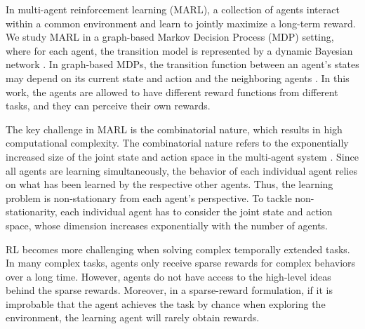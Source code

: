 \documentclass[conf]{new-aiaa}
\begin{document}
In multi-agent reinforcement learning (MARL), a collection of agents interact within a common environment and learn to jointly maximize a long-term reward. We study MARL in a graph-based Markov Decision Process (MDP) setting, where for each agent, the transition model is represented by a dynamic Bayesian network \cite{dean1989model, guestrin2003efficient}. In graph-based MDPs, the transition function between an agent's states may depend on its current state and action and the neighboring agents \cite{forsell2006approximate, cheng2013variational}. In this work, the agents are allowed to have different reward functions from different tasks, and they can perceive their own rewards.



The key challenge in MARL is the combinatorial nature, which results in high computational complexity. The combinatorial nature refers to the exponentially increased size of the joint state and action space in the multi-agent system \cite{blondel2000survey, hernandez2019survey}. Since all agents are learning simultaneously, the behavior of each individual agent relies on what has been learned by the respective other agents. Thus, the learning problem is non-stationary from each agent's perspective. To tackle non-stationarity, each individual agent has to consider the joint state and action space, whose dimension increases exponentially with the number of agents.  

RL becomes more challenging when solving complex temporally extended tasks. In many complex tasks, agents only receive sparse rewards for complex behaviors over a long time. However, agents do not have access to the high-level ideas behind the sparse rewards. Moreover, in a sparse-reward formulation, if it is improbable that the agent achieves the task by chance when exploring the environment, the learning agent will rarely obtain rewards.


\end{document}
